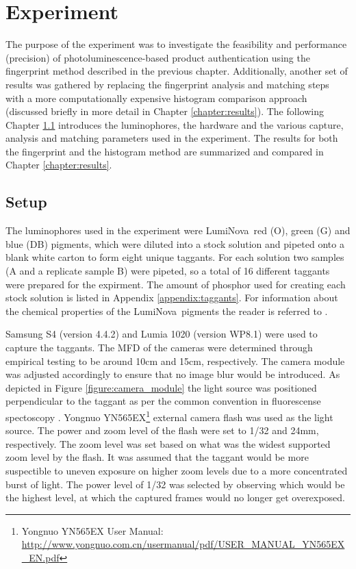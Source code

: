 \documentclass[thesis.tex]{subfiles}
\begin{document}
\chapter{Experiment}
\label{chapter:experiment}

The purpose of the experiment was to investigate the feasibility and performance (precision) of photoluminescence-based product authentication using the fingerprint method described in the previous chapter. Additionally, another set of results was gathered by replacing the fingerprint analysis and matching steps with a more computationally expensive histogram comparison approach (discussed briefly in more detail in Chapter \ref{chapter:results}). The following Chapter \ref{chapter:setup} introduces the luminophores, the hardware and the various capture, analysis and matching parameters used in the experiment. The results for both the fingerprint and the histogram method are summarized and compared in Chapter \ref{chapter:results}.

\section{Setup}
\label{chapter:setup}

The luminophores used in the experiment were LumiNova\textregistered\ red (O), green (G) and blue (DB) pigments, which were diluted into a stock solution and pipeted onto a blank white carton to form eight unique taggants. For each solution two samples (A and a replicate sample B) were pipeted, so a total of 16 different taggants were prepared for the expirment. The amount of phosphor used for creating each stock solution is listed in Appendix \ref{appendix:taggants}. For information about the chemical properties of the LumiNova\textregistered\ pigments the reader is referred to \cite{luminova}.

Samsung S4 (version 4.4.2) and Lumia 1020 (version WP8.1) were used to capture the taggants. The MFD of the cameras were determined through empirical testing to be around 10cm and 15cm, respectively. The camera module was adjusted accordingly to ensure that no image blur would be introduced. As depicted in Figure \ref{figure:camera_module} the light source was positioned perpendicular to the taggant as per the common convention in fluorescense spectoscopy \cite{spectroscopy-principles}. Yongnuo YN565EX\footnote{Yongnuo YN565EX User Manual: \url{http://www.yongnuo.com.cn/usermanual/pdf/USER_MANUAL_YN565EX_EN.pdf}} external camera flash was used as the light source. The power and zoom level of the flash were set to 1/32 and 24mm, respectively. The zoom level was set based on what was the widest supported zoom level by the flash. It was assumed that the taggant would be more suspectible to uneven exposure on higher zoom levels due to a more concentrated burst of light. The power level of 1/32 was selected by observing which would be the highest level, at which the captured frames would no longer get overexposed.
\end{document}
